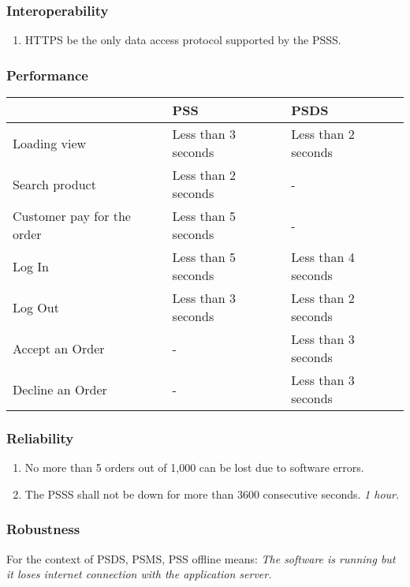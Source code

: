 \subsubsection{Interoperability}
\begin{enumerate}[label=IOP-\arabic*]
    \item HTTPS be the only data access protocol supported by the PSSS.
\end{enumerate}

\subsubsection{Performance}
\begin{center}
    \begin{tabular}{p{}p{}p{}}
    \hline
    \textbf{} & \textbf{PSS} & \textbf{PSDS} \\ 
     \hline
     Loading view & Less than 3 seconds & Less than 2 seconds \\  
     \hline
     Search product & Less than 2 seconds & - \\  
     \hline
     Customer pay for the order & Less than 5 seconds & - \\  
     \hline
     Log In & Less than 5 seconds & Less than 4 seconds \\  
     \hline
     Log Out & Less than 3 seconds & Less than 2 seconds \\  
     \hline
     Accept an Order & - & Less than 3 seconds \\  
     \hline
     Decline an Order & - & Less than 3 seconds \\  
     \hline
    \end{tabular}
\end{center}

\pagebreak

\subsubsection{Reliability}
\begin{enumerate}[label=REL-\arabic*]
    \item No more than 5 orders out of 1,000 can be lost due to software errors.
    \item The PSSS shall not be down for more than 3600 consecutive 
    seconds. \textit{1 hour}.
\end{enumerate}

\subsubsection{Robustness}
For the context of PSDS, PSMS, PSS offline means: \textit{The software is 
running but it loses internet connection with the application server.}

